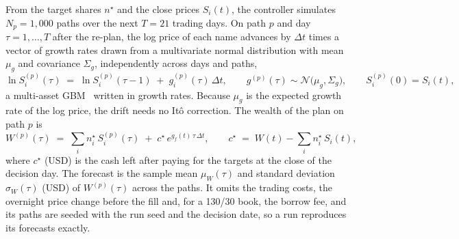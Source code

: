 From the target shares $n^\star$ and the close prices $S_i(t)$, the controller simulates $N_p = 1{,}000$ paths over
the next $T = 21$ trading days. On path $p$ and day $\tau = 1, \dots, T$ after the re-plan, the log price of each
name advances by $\Delta t$ times a vector of growth rates drawn from a multivariate normal distribution with mean
$\mu_g$ and covariance $\Sigma_g$, independently across days and paths,
\begin{equation}
  \ln S^{(p)}_i(\tau) \;=\; \ln S^{(p)}_i(\tau-1) \;+\; g^{(p)}_i(\tau)\,\Delta t,
  \qquad g^{(p)}(\tau) \sim \mathcal{N}\big(\mu_g, \Sigma_g\big),
  \qquad S^{(p)}_i(0) = S_i(t),
  \label{eq:mpc-gbm}
\end{equation}
a multi-asset GBM~\cite{glasserman2003} written in growth rates. Because $\mu_g$ is the expected growth rate of the
log price, the drift needs no It\^o correction. The wealth of the plan on path $p$ is
\begin{equation}
  W^{(p)}(\tau) \;=\; \sum_i n^\star_i\, S^{(p)}_i(\tau) \;+\; c^\star\, e^{g_f(t)\,\tau\,\Delta t},
  \qquad c^\star \;=\; W(t) - \sum_i n^\star_i\, S_i(t),
  \label{eq:mpc-value}
\end{equation}
where $c^\star$ (USD) is the cash left after paying for the targets at the close of the decision day. The forecast
is the sample mean $\mu_W(\tau)$ and standard deviation $\sigma_W(\tau)$ (USD) of $W^{(p)}(\tau)$ across the paths.
It omits the trading costs, the overnight price change before the fill and, for a 130/30 book, the borrow fee, and
its paths are seeded with the run seed and the decision date, so a run reproduces its forecasts exactly.

